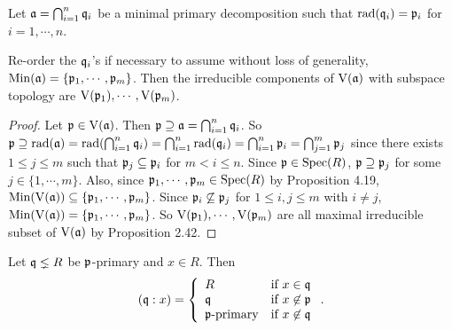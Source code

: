 \noindent Let $\mathfrak{a} = \bigcap_{i=1}^{n} \mathfrak{q}_i$ be a minimal primary decomposition such that $\operatorname{rad}(\mathfrak{q}_i) = \mathfrak{p}_i$ for $i = 1,\cdots,n$.

\begin{proposition}
    Re-order the $\mathfrak{q}_i$'s if necessary to assume without loss of generality, $\operatorname{Min}(\mathfrak{a}) = \{\mathfrak{p}_1,\cdots,\mathfrak{p}_m\}$. Then the irreducible components of $\operatorname{V}(\mathfrak{a})$ with subspace topology are $\operatorname{V}(\mathfrak{p}_1),\cdots,\operatorname{V}(\mathfrak{p}_m)$.
\end{proposition}

\begin{proof}
    Let $\mathfrak{p} \in \operatorname{V}(\mathfrak{a})$. Then $\mathfrak{p} \supseteq \mathfrak{a} = \bigcap_{i=1}^{n} \mathfrak{q}_i$. So $\mathfrak{p} \supseteq \operatorname{rad}(\mathfrak{a}) = \operatorname{rad}(\bigcap_{i=1}^{n}\mathfrak{q}_i) = \bigcap_{i=1}^{n} \operatorname{rad}(\mathfrak{q}_i) = \bigcap_{i=1}^{n} \mathfrak{p}_i = \bigcap_{j=1}^{m} \mathfrak{p}_j$ since there exists $1 \leq j \leq m$ such that $\mathfrak{p}_j \subseteq \mathfrak{p}_i$ for $m < i \leq n$. Since $\mathfrak{p} \in \operatorname{Spec}(R)$, $\mathfrak{p} \supseteq \mathfrak{p}_j$ for some $j \in \{1,\cdots,m\}$. Also, since $\mathfrak{p}_1,\cdots, \mathfrak{p}_m \in \operatorname{Spec}(R)$ by Proposition 4.19, $\operatorname{Min}(\operatorname{V}(\mathfrak{a})) \subseteq \{\mathfrak{p}_1,\cdots,\mathfrak{p}_m\}$. Since $\mathfrak{p}_i \not\subseteq \mathfrak{p}_j$ for $1 \leq i,j \leq m$ with $i \neq j$, $\operatorname{Min}(\operatorname{V}(\mathfrak{a})) = \{\mathfrak{p}_1,\cdots,\mathfrak{p}_m\}$. So $\operatorname{V}(\mathfrak{p}_1),\cdots,\operatorname{V}(\mathfrak{p}_m)$ are all maximal irreducible subset of $\operatorname{V}(\mathfrak{a})$ by Proposition 2.42. 
\end{proof}

\begin{proposition}
    Let $\mathfrak{q} \lneq R$ be $\mathfrak{p}$-primary and $x \in R$. Then 
    \[
        (\mathfrak{q}:x) = \left\{
            \begin{array}{ll}
                R &\text{if }x \in \mathfrak{q} \\
                \mathfrak{q} &\text{if }x \not \in \mathfrak{p} \\
                \mathfrak{p}\text{-primary} &\text{if }x \not \in \mathfrak{q} \\
            \end{array}
        \right..
    \]
\end{proposition}

